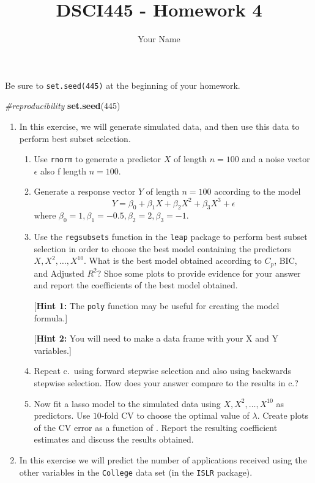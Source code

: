 \documentclass[
]{article}
\title{DSCI445 - Homework 4}
\author{Your Name}
\date{}
\newenvironment{Shaded}{\begin{snugshade}}{\end{snugshade}}
\newcommand{\CommentTok}[1]{\textcolor[rgb]{0.56,0.35,0.01}{\textit{#1}}}
\newcommand{\DecValTok}[1]{\textcolor[rgb]{0.00,0.00,0.81}{#1}}
\newcommand{\FunctionTok}[1]{\textcolor[rgb]{0.13,0.29,0.53}{\textbf{#1}}}
\newcommand{\NormalTok}[1]{#1}
\begin{document}
\maketitle

Be sure to \texttt{set.seed(445)} at the beginning of your homework.

\begin{Shaded}
\begin{Highlighting}[]
\CommentTok{\#reproducibility}
\FunctionTok{set.seed}\NormalTok{(}\DecValTok{445}\NormalTok{)}
\end{Highlighting}
\end{Shaded}

\begin{enumerate}
\def\labelenumi{\arabic{enumi}.}
\item
  In this exercise, we will generate simulated data, and then use this
  data to perform best subset selection.

  \begin{enumerate}
  \def\labelenumii{\alph{enumii})}
  \item
    Use \texttt{rnorm} to generate a predictor \(X\) of length
    \(n = 100\) and a noise vector \(\epsilon\) also f length
    \(n = 100\).
  \item
    Generate a response vector \(Y\) of length \(n = 100\) according to
    the model \[
     Y = \beta_0 + \beta_1 X + \beta_2 X^2 + \beta_3 X^3 + \epsilon
     \] where
    \(\beta_0 = 1, \beta_1 = -0.5, \beta_2 = 2, \beta_3 = -1\).
  \item
    Use the \texttt{regsubsets} function in the \texttt{leap} package to
    perform best subset selection in order to choose the best model
    containing the predictors \(X, X^2, \dots, X^{10}\). What is the
    best model obtained according to \(C_p\), BIC, and Adjusted \(R^2\)?
    Shoe some plots to provide evidence for your answer and report the
    coefficients of the best model obtained.

    {[}\textbf{Hint 1:} The \texttt{poly} function may be useful for
    creating the model formula.{]}

    {[}\textbf{Hint 2:} You will need to make a data frame with your X
    and Y variables.{]}
  \item
    Repeat c.~using forward stepwise selection and also using backwards
    stepwise selection. How does your answer compare to the results in
    c.?
  \item
    Now fit a lasso model to the simulated data using
    \(X, X^2, \dots, X^{10}\) as predictors. Use \(10\)-fold CV to
    choose the optimal value of \(\lambda\). Create plots of the CV
    error as a function of \lambda. Report the resulting coefficient
    estimates and discuss the results obtained.
  \end{enumerate}
\item
  In this exercise we will predict the number of applications received
  using the other variables in the \texttt{College} data set (in the
  \texttt{ISLR} package).


\end{enumerate}
\end{document}
